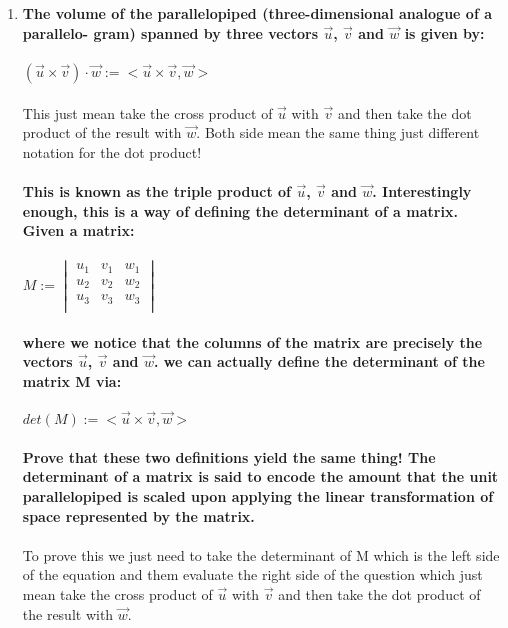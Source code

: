 \documentclass{article}
\begin{document}
\section{}
\begin{enumerate}[a]
\item\textbf{The volume of the parallelopiped (three-dimensional analogue of a parallelo-
gram) spanned by three vectors $\vec{u}$, $\vec{v}$ and $\vec{w}$ is given by:}\\
\\
$(\vec{u}\times\vec{v})\cdot\vec{w}:=<\vec{u}\times\vec{v},\vec{w}>$\\
\\ This just mean take the cross product of $\vec{u}$ with $\vec{v}$ and then take the dot product of the result with $\vec{w}$. Both side mean the same thing just different notation for the dot product!\\
\\
\textbf{This is known as the triple product of $\vec{u}$, $\vec{v}$ and $\vec{w}$. Interestingly enough, this is a way of defining the determinant of a matrix. Given a matrix:}\\
\\
$M:=\begin{vmatrix}
u_{1}&v_{1}&w_{1}\\
u_{2}&v_{2}&w_{2}\\
u_{3}&v_{3}&w_{3}\\
\end{vmatrix}$\\
\\
\textbf{where we notice that the columns of the matrix are precisely the vectors $\vec{u}$, $\vec{v}$ and $\vec{w}$. we can actually define the determinant of the matrix M via:}\\
\\
$det(M ) := <\vec{u}\times\vec{v},\vec{w}>$\\
\\
\textbf{Prove that these two definitions yield the same thing! The determinant of a
matrix is said to encode the amount that the unit parallelopiped is scaled upon
applying the linear transformation of space represented by the matrix.}\\
\\
To prove this we just need to take the determinant of M which is the left side of the equation and them evaluate the right side of the question which just mean take the cross product of $\vec{u}$ with $\vec{v}$ and then take the dot product of the result with $\vec{w}$.\\

\end{enumerate}
\end{document}
